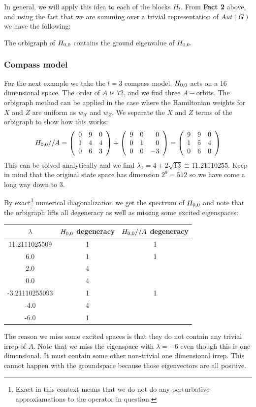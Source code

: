 \documentclass[12pt]{article}
\renewenvironment{framed}[1][\hsize]{%
\def\FrameCommand{{\color{black}\vrule width 3pt}\hspace{0pt}\fboxsep=\FrameSep\colorbox{lightgray}}%
\MakeFramed{\hsize0.8\linewidth\advance\hsize-\width\FrameRestore}}
{\endMakeFramed}
\begin{document}
In general, we will apply this idea to each of the blocks $H_t$.
From {\bf Fact 2} above, and using the fact that we are
summing over a trivial representation of $Aut(G)$ we have the following:
\begin{framed}

The orbigraph of $H_{0,0}$ contains the ground eigenvalue of $H_{0,0}.$
\end{framed}

%
\subsubsection{Compass model}
For the next example we take the $l=3$ compass model.
$H_{0,0}$ acts on a 16 dimensional space.
The order of $A$ is $72$, and we find three $A-$orbits.
The orbigraph method can be applied in the case
where the Hamiltonian weights for $X$ and $Z$ are uniform as $w_X$ and $w_Z.$
We separate the $X$ and $Z$ terms of the orbigraph to show
how this works:
$$
H_{0,0}//A = 
\left(\begin{array}{rrr}
 0 &  9 &  0 \cr
  1 &  4 &  4 \cr
  0 &  6 &  3
\end{array}\right) + 
\left(\begin{array}{rrr}
 9 &  0 &  0 \cr
  0 &  1 &  0 \cr
  0 &  0 &  -3
\end{array}\right)
=
\left(\begin{array}{rrr}
 9 &  9 &  0 \cr
  1 &  5 &  4 \cr
  0 &  6 &  0
\end{array}\right)
$$
This can be solved analytically and we find $\lambda_1 = 4+2\sqrt{13} \cong 11.21110255.$
Keep in mind that the original state space has dimension $2^9=512$ so we
have come a long way down to 3.

By exact\footnote{Exact in this context means that we do not do any
perturbative approxiamations to the operator in question.}
numerical diagonalization
we get the spectrum of $H_{0,0}$ and note that the orbigraph lifts
all degeneracy as well as missing some excited eigenspaces:
\begin{center}
\begin{tabular}{ c|c|c } 
$\lambda$ & $H_{0,0}$ degeneracy & $H_{0,0}//A$ degeneracy \\
\hline
    11.2111025509 & 1 & 1 \\
    6.0 & 1 & 1 \\
    2.0 & 4 &   \\
    0.0 & 4 &   \\
    -3.21110255093 & 1 & 1 \\
    -4.0 & 4 &   \\
    -6.0 & 1 &   
\end{tabular}
\end{center}
The reason we miss some excited spaces is that they do not contain
any trivial irrep of $A.$
Note that we miss the eigenspace with $\lambda = -6$
even though this is one dimensional. It must contain some other non-trivial
one dimensional irrep. This cannot happen with the groundspace because
those eigenvectors are all positive.
\end{document}
